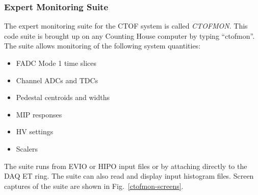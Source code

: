 \documentclass[12pt]{article}
\begin{document}
\subsubsection{Expert Monitoring Suite}
\label{ctofmon}

The expert monitoring suite for the CTOF system is called {\it CTOFMON}. This code 
suite is brought up on any Counting House computer by typing ``ctofmon''. The suite 
allows monitoring of the following system quantities:

\begin{itemize}
\item FADC Mode 1 time slices
\item Channel ADCs and TDCs
\item Pedestal centroids and widths
\item MIP responses
\item HV settings
\item Scalers
\end{itemize}

The suite runs from EVIO or HIPO input files or by attaching directly to the DAQ 
ET ring. The suite can also read and display input histogram files. Screen captures 
of the suite are shown in Fig.~\ref{ctofmon-screens}. 
\end{document}
